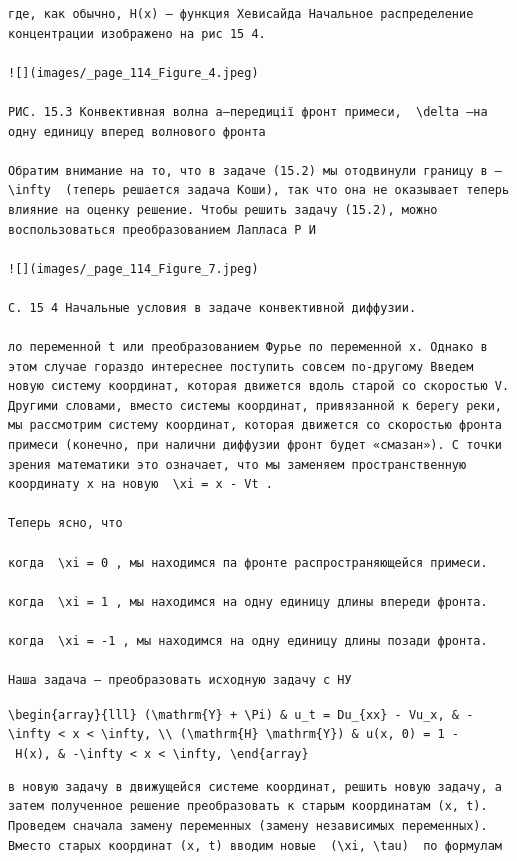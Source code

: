 \documentclass[
  ukrainian,
]{article}
\begin{document}
\begin{verbatim}
где, как обычно, H(x) — функция Хевисайда Начальное распределение концентрации изображено на рис 15 4.

![](images/_page_114_Figure_4.jpeg)

РИС. 15.3 Конвективная волна a—передиції фронт примеси,  \delta —на одну единицу вперед волнового фронта

Обратим внимание на то, что в задаче (15.2) мы отодвинули границу в —  \infty  (теперь решается задача Коши), так что она не оказывает теперь влияние на оценку решение. Чтобы решить задачу (15.2), можно воспользоваться преобразованием Лапласа Р И

![](images/_page_114_Figure_7.jpeg)

С. 15 4 Начальные условия в задаче конвективной диффузии.

ло переменной t или преобразованием Фурье по переменной x. Однако в этом случае гораздо интереснее поступить совсем по-другому Введем новую систему координат, которая движется вдоль старой со скоростью V. Другими словами, вместо системы координат, привязанной к берегу реки, мы рассмотрим систему координат, которая движется со скоростью фронта примеси (конечно, при налични диффузии фронт будет «смазан»). С точки зрения математики это означает, что мы заменяем пространственную координату x на новую  \xi = x - Vt .

Теперь ясно, что

когда  \xi = 0 , мы находимся па фронте распространяющейся примеси.

когда  \xi = 1 , мы находимся на одну единицу длины впереди фронта.

когда  \xi = -1 , мы находимся на одну единицу длины позади фронта.

Наша задача — преобразовать исходную задачу с НУ
\end{verbatim}

\texttt{\textbackslash{}begin\{array\}\{lll\}\ (\textbackslash{}mathrm\{Y\}\ +\ \textbackslash{}Pi)\ \&\ u\_t\ =\ Du\_\{xx\}\ -\ Vu\_x,\ \&\ -\textbackslash{}infty\ \textless{}\ x\ \textless{}\ \textbackslash{}infty,\ \textbackslash{}\textbackslash{}\ (\textbackslash{}mathrm\{H\}\ \textbackslash{}mathrm\{Y\})\ \&\ u(x,\ 0)\ =\ 1\ -\ H(x),\ \&\ -\textbackslash{}infty\ \textless{}\ x\ \textless{}\ \textbackslash{}infty,\ \textbackslash{}end\{array\}}

\begin{verbatim}
в новую задачу в движущейся системе координат, решить новую задачу, а затем полученное решение преобразовать к старым координатам (x, t). Проведем сначала замену переменных (замену независимых переменных). Вместо старых координат (x, t) вводим новые  (\xi, \tau)  по формулам
\end{verbatim}
\end{document}
